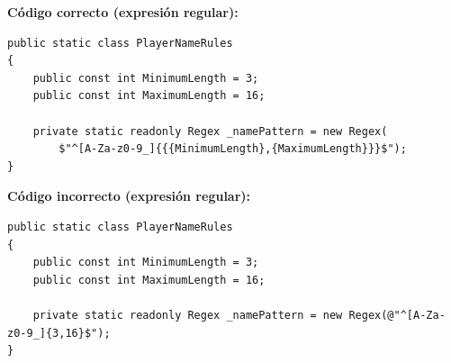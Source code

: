 \textbf{Código correcto (expresión regular):}
\begin{lstlisting}[style=csharpstyle]
public static class PlayerNameRules
{
    public const int MinimumLength = 3;
    public const int MaximumLength = 16;

    private static readonly Regex _namePattern = new Regex(
        $"^[A-Za-z0-9_]{{{MinimumLength},{MaximumLength}}}$");
}
\end{lstlisting}

\textbf{Código incorrecto (expresión regular):}
\begin{lstlisting}[style=csharpstyle]
public static class PlayerNameRules
{
    public const int MinimumLength = 3;
    public const int MaximumLength = 16;

    private static readonly Regex _namePattern = new Regex(@"^[A-Za-z0-9_]{3,16}$");
}
\end{lstlisting}
